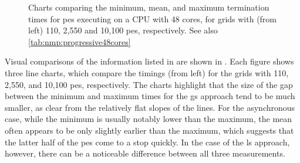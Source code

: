 \begin{figure}
    \centering
    \caption[Charts comparing the minimum, mean, and maximum termination times for s on a 48-core CPU]{Charts comparing the minimum, mean, and maximum termination times for \glspl{pe} executing on a CPU with 48 cores, for grids with (from left) 110, 2,550 and 10,100 \glspl{pe}, respectively.  See also \cref{tab:nmp:progressive48cores}}
    \label{fig:nmp:progressivecharts48cores}
\end{figure}

Visual comparisons of the information listed in  are shown in .  Each figure shows three line charts, which compare the timings (from left) for the grids with 110, 2,550, and 10,100 \glspl{pe}, respectively.  The charts highlight that the size of the gap between the minimum and maximum times for the \gls{gs} approach tend to be much smaller, as clear from the relatively flat slopes of the lines.  For the asynchronous case, while the minimum is usually notably lower than the maximum, the mean often appears to be only slightly earlier than the maximum, which suggests that the latter half of the \glspl{pe} come to a stop quickly.  In the case of the \gls{ls} approach, however, there can be a noticeable difference between all three measurements.

